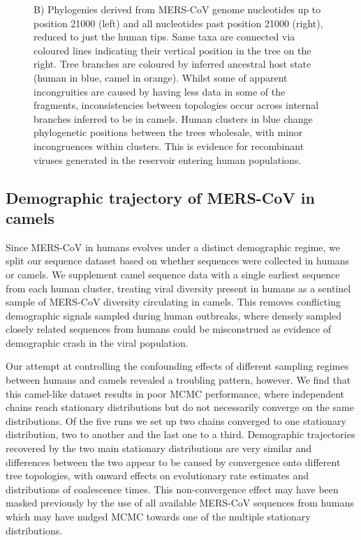 \documentclass[11pt,oneside,letterpaper]{article}
\begin{document}
\begin{figure}
{    B) Phylogenies derived from MERS-CoV genome nucleotides up to position 21000 (left) and all nucleotides past position 21000 (right), reduced to just the human tips.
  	Same taxa are connected via coloured lines indicating their vertical position in the tree on the right.
  	Tree branches are coloured by inferred ancestral host state (human in blue, camel in orange).
  	Whilst some of apparent incongruities are caused by having less data in some of the fragments, inconsistencies between topologies occur across internal branches inferred to be in camels.
  	Human clusters in blue change phylogenetic positions between the trees wholesale, with minor incongruences within clusters.
  	This is evidence for recombinant viruses generated in the reservoir entering human populations.
    }%
    \label{recombination}%
\end{figure}




\subsection*{Demographic trajectory of MERS-CoV in camels}
Since MERS-CoV in humans evolves under a distinct demographic regime, we split our sequence dataset based on whether sequences were collected in humans or camels.
We supplement camel sequence data with a single earliest sequence from each human cluster, treating viral diversity present in humans as a sentinel sample of MERS-CoV diversity circulating in camels.
This removes conflicting demographic signals sampled during human outbreaks, where densely sampled closely related sequences from humans could be misconstrued as evidence of demographic crash in the viral population.

Our attempt at controlling the confounding effects of different sampling regimes between humans and camels revealed a troubling pattern, however.
We find that this camel-like dataset results in poor MCMC performance, where independent chains reach stationary distributions but do not necessarily converge on the same distributions.
Of the five runs we set up two chains converged to one stationary distribution, two to another and the last one to a third.
Demographic trajectories recovered by the two main stationary distributions are very similar and differences between the two appear to be caused by convergence onto different tree topologies, with onward effects on evolutionary rate estimates and distributions of coalescence times.
This non-convergence effect may have been masked previously by the use of all available MERS-CoV sequences from humans which may have nudged MCMC towards one of the multiple stationary distributions.
\end{document}
